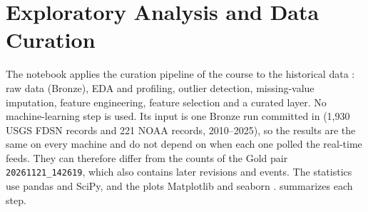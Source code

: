 \documentclass[a4paper,11pt,oneside]{book}
\newcommand{\goldstamp}{\texttt{20261121\_142619}}
\begin{document}
\chapter{Exploratory Analysis and Data Curation}
\label{ch:curation}
The notebook  applies the curation pipeline of the course to the historical data \cite{curationnb,edaguide}: raw data (Bronze), EDA and profiling, outlier detection, missing-value imputation, feature engineering, feature selection and a curated layer. No machine-learning step is used. Its input is one Bronze run committed in  (1,930 USGS FDSN records and 221 NOAA records, 2010--2025), so the results are the same on every machine and do not depend on when each one polled the real-time feeds. They can therefore differ from the counts of the Gold pair \goldstamp, which also contains later revisions and events. The statistics use pandas and SciPy, and the plots Matplotlib and seaborn \cite{pandas,scipy,seaborn}.  summarizes each step.
\end{document}
